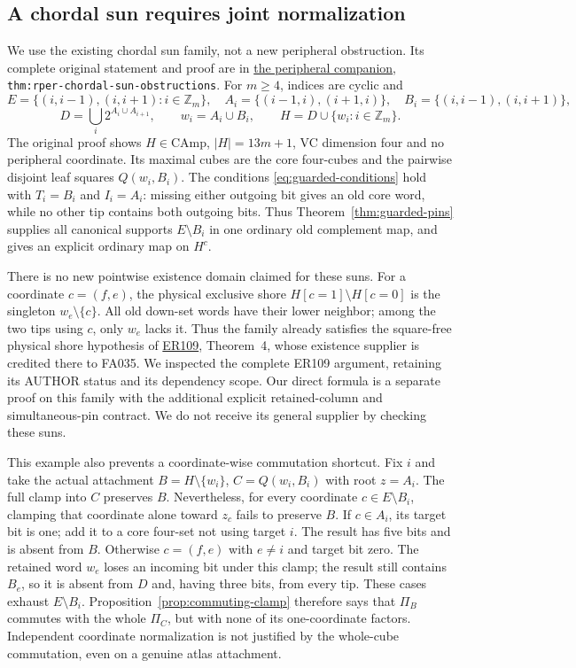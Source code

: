 \documentclass[11pt]{article}
\theoremstyle{definition}
\begin{document}
\subsection{A chordal sun requires joint normalization}
\label{sec:sun-normalization}
We use the existing chordal sun family, not a new peripheral obstruction.
Its complete original statement and proof are in
\href{../../cover-recursive/research/rper_chordal_sun_obstructions.tex}
{the peripheral companion}, \texttt{thm:rper-chordal-sun-obstructions}.
For $m\ge4$, indices are cyclic and
\[
 E=\{(i,i-1),(i,i+1):i\in\mathbb Z_m\},\quad
 A_i=\{(i-1,i),(i+1,i)\},\quad B_i=\{(i,i-1),(i,i+1)\},
\]
\[
 D=\bigcup_i2^{A_i\cup A_{i+1}},\qquad
 w_i=A_i\cup B_i,\qquad H=D\cup\{w_i:i\in\mathbb Z_m\}.
\]
The original proof shows $H\in\mathrm{CAmp}$, $|H|=13m+1$, VC dimension
four and no peripheral coordinate. Its maximal cubes are the core
four-cubes and the pairwise disjoint leaf squares $Q(w_i,B_i)$.
The conditions \eqref{eq:guarded-conditions} hold with $T_i=B_i$ and
$I_i=A_i$: missing either outgoing bit gives an old core word, while no
other tip contains both outgoing bits. Thus Theorem~\ref{thm:guarded-pins}
supplies all canonical supports $E\setminus B_i$ in one ordinary old
complement map, and gives an explicit ordinary map on $H^c$.

There is no new pointwise existence domain claimed for these suns.
For a coordinate $c=(f,e)$, the physical exclusive shore
$H[c=1]\setminus H[c=0]$ is the singleton $w_e\setminus\{c\}$.
All old down-set words have their lower neighbor; among the two tips
using $c$, only $w_e$ lacks it. Thus the family already satisfies the
square-free physical shore hypothesis of
\href{../../containment-ext-rep/research/ER109_SQUARE_FREE_PRIVATE_COMPLEMENTS.md}
{ER109}, Theorem~4, whose existence supplier is credited there to FA035.
We inspected the complete ER109 argument, retaining its AUTHOR status and
its dependency scope. Our direct formula is a separate proof on this
family with the additional explicit retained-column and simultaneous-pin
contract. We do not receive its general supplier by checking these suns.

This example also prevents a coordinate-wise commutation shortcut.
Fix $i$ and take the actual attachment
$B=H\setminus\{w_i\}$, $C=Q(w_i,B_i)$ with root $z=A_i$.
The full clamp into $C$ preserves $B$. Nevertheless, for every coordinate
$c\in E\setminus B_i$, clamping that coordinate alone toward $z_c$
fails to preserve $B$. If $c\in A_i$, its target bit is one; add it
to a core four-set not using target $i$. The result has five bits and
is absent from $B$. Otherwise $c=(f,e)$ with $e\ne i$ and target bit
zero. The retained word $w_e$ loses an incoming bit under this clamp;
the result still contains $B_e$, so it is absent from $D$ and, having
three bits, from every tip. These cases exhaust $E\setminus B_i$.
Proposition~\ref{prop:commuting-clamp} therefore says that $\Pi_B$
commutes with the whole $\Pi_C$, but with none of its one-coordinate
factors. Independent coordinate normalization is not justified by the
whole-cube commutation, even on a genuine atlas attachment.
\end{document}
